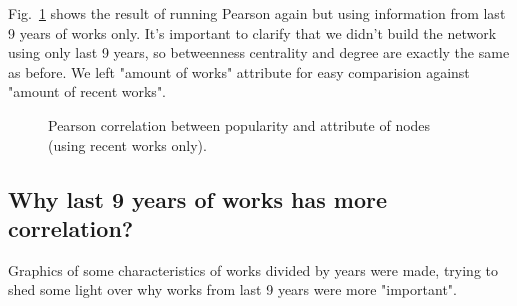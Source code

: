 Fig.~\ref{fig:pearsonCorrRecentWorks} shows the result of running Pearson again but using information from last 9 years of works only. It's important to clarify that we didn't build the network using only last 9 years, so betweenness centrality and degree are exactly the same as before. We left "amount of works" attribute for easy comparision against "amount of recent works".

\begin{figure}[!h]
	\begin{flushleft}
	\caption{Pearson correlation between popularity and attribute of nodes (using recent works only).}
	\label{fig:pearsonCorrRecentWorks}
	\end{flushleft}
\end{figure}

\FloatBarrier
\subsection{Why last 9 years of works has more correlation?}
Graphics of some characteristics of works divided by years were made, trying to shed some light over why works from last 9 years were more "important".

